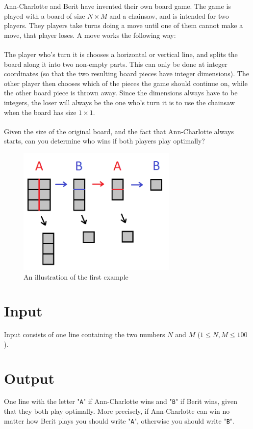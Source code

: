 
Ann-Charlotte and Berit have invented their own board game. The game is played
with a board of size $N \times M$ and a chainsaw, and is intended for two players.
They players take turns doing a move until one of them cannot make a move,
that player loses. A move works the following way:
\\\\
The player who's turn it is chooses a horizontal or vertical line, and splits the board along it
into two non-empty parts. This can only be done at integer coordinates (so that the two
resulting board pieces have integer dimensions). The other player then chooses which of the
pieces the game should continue on, while the other board piece is thrown away. Since
the dimensions always have to be integers, the loser will always be the one who's turn it is to
use the chainsaw when the board has size $1 \times 1$.
\\\\
Given the size of the original board, and the fact that Ann-Charlotte always starts,
can you determine who wins if both players play optimally?

\begin{figure}[ht!]
\centering
\includegraphics[width=0.7\textwidth]{bradspelet.png}
\caption{An illustration of the first example}
\label{overflow}
\end{figure}

\section*{Input}
Input consists of one line containing the two numbers $N$ and $M$ ($1 \le N,M \le 100$).

\section*{Output}
One line with the letter "\texttt{A}" if Ann-Charlotte wins and "\texttt{B}" if
Berit wins, given that they both play optimally. More precisely, if Ann-Charlotte
can win no matter how Berit plays you should write "\texttt{A}", otherwise you
should write "\texttt{B}".

